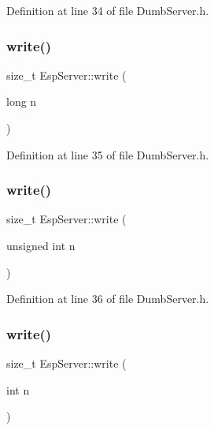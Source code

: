 Definition at line 34 of file Dumb\+Server.\+h.

\mbox{\label{class_esp_server_ac256a11ccc8d32664729a7f5bfc71add}} 
\subsubsection{\texorpdfstring{write()}{write()}\hspace{0.1cm}{\footnotesize\ttfamily [4/6]}}
{\footnotesize\ttfamily size\+\_\+t Esp\+Server\+::write (\begin{DoxyParamCaption}\item[{long}]{n }\end{DoxyParamCaption})\hspace{0.3cm}{\ttfamily [inline]}}



Definition at line 35 of file Dumb\+Server.\+h.

\mbox{\label{class_esp_server_afde7c57b12659422147d9a5e56b76148}} 
\subsubsection{\texorpdfstring{write()}{write()}\hspace{0.1cm}{\footnotesize\ttfamily [5/6]}}
{\footnotesize\ttfamily size\+\_\+t Esp\+Server\+::write (\begin{DoxyParamCaption}\item[{unsigned int}]{n }\end{DoxyParamCaption})\hspace{0.3cm}{\ttfamily [inline]}}



Definition at line 36 of file Dumb\+Server.\+h.

\mbox{\label{class_esp_server_a2a49890c886a2b0569b11e02f986f867}} 
\subsubsection{\texorpdfstring{write()}{write()}\hspace{0.1cm}{\footnotesize\ttfamily [6/6]}}
{\footnotesize\ttfamily size\+\_\+t Esp\+Server\+::write (\begin{DoxyParamCaption}\item[{int}]{n }\end{DoxyParamCaption})\hspace{0.3cm}{\ttfamily [inline]}}



